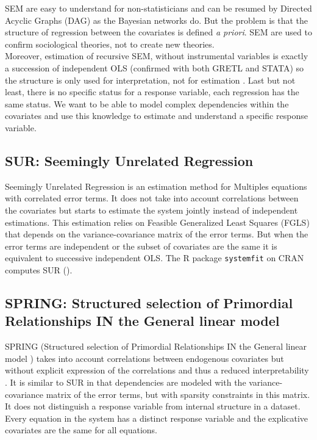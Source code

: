 \documentclass[12pt,a4paper]{report}
\begin{document}
		SEM are easy to understand for non-statisticians and can be resumed by Directed Acyclic Graphs (DAG) as the Bayesian networks do. But the problem is that the structure of regression between the covariates is defined {\it a priori}. SEM are used to confirm sociological theories, not to create new theories. \\
		
		Moreover, estimation of recursive SEM, without instrumental variables is exactly a succession of independent OLS (confirmed with both GRETL and STATA) so the structure is only used for interpretation, not for estimation \cite{brito2006graphical}. Last but not least, there is no specific status for a response variable, each regression has the same status. We want to be able to model complex dependencies within the covariates and use this knowledge to estimate and understand a specific response variable.
		\subsection{SUR: Seemingly Unrelated Regression}		%
		Seemingly Unrelated Regression \cite{SURzellner} is an estimation method for Multiples equations with correlated error terms. It does not take into account correlations between the covariates but starts to estimate the system jointly instead of independent estimations. This estimation relies on Feasible Generalized Least Squares (FGLS) that depends on the variance-covariance matrix of the error terms. But when the error terms are independent or the subset of covariates are the same it is equivalent to successive independent OLS. The R package {\tt systemfit} on CRAN computes SUR (\cite{packagesystemfit}). 
			
		\subsection{SPRING: Structured selection of Primordial Relationships IN the General linear model}		%

\textsc{SPRING} (Structured selection of Primordial Relationships IN the General linear model ) takes into account correlations between endogenous covariates but without explicit expression of the correlations and thus a reduced interpretability \cite{chiquetconf}. It is similar to SUR in that dependencies are modeled with the variance-covariance matrix of the error terms, but with sparsity constraints in this matrix.  It does not distinguish a response variable from internal structure in a dataset. Every equation in the system has a distinct response variable and the explicative covariates are the same for all equations.		
\end{document}
